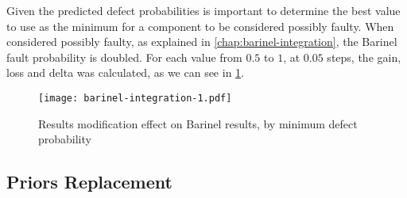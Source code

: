 Given the predicted defect probabilities is important to determine the best value to use as the minimum for a component to be considered possibly faulty. When considered possibly faulty, as explained in \ref{chap:barinel-integration}, the Barinel fault probability is doubled. For each value from $0.5$ to $1$, at $0.05$ steps, the gain, loss and delta was calculated, as we can see in \ref{fig:results-modification}.

\begin{figure}[!]
  \begin{center}
    \leavevmode
    \texttt{[image: barinel-integration-1.pdf]}
    \caption{Results modification effect on Barinel results, by minimum defect probability}
    \label{fig:results-modification}
  \end{center}
\end{figure}


\subsection{Priors Replacement}

